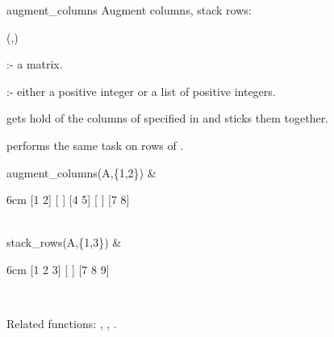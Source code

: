 \begin{Operator}{augment_columns}
Augment columns, stack rows:

\begin{Syntax}
(,)
\end{Syntax}

       :- a matrix. 

 :-  either a positive integer or a list of positive 
                        integers. 

 gets hold of the columns of  
specified in  and sticks them together. 

 performs the same task on rows of .

\begin{Examples}

augment_columns(A,\{1,2\}) &
\begin{multilineoutput}{6cm} 
[1  2]
[    ]
[4  5]
[    ]
[7  8]
\end{multilineoutput} \\

stack_rows(A,\{1,3\}) &
\begin{multilineoutput}{6cm}
[1  2  3]
[       ]
[7  8  9]
\end{multilineoutput} \\
\end{Examples}

Related functions:
,  , .

\end{Operator}


